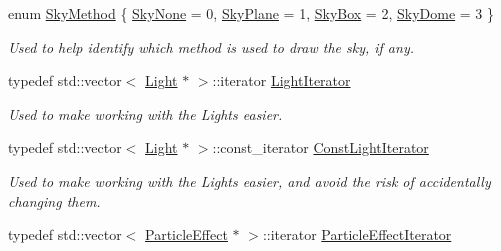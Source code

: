 \begin{DoxyCompactItemize}
enum \hyperlink{classphys_1_1SceneManager_a91dd086aabaab926d070c65fc14828d6}{SkyMethod} \{ \hyperlink{classphys_1_1SceneManager_a91dd086aabaab926d070c65fc14828d6a11aa0789aa0b39732c6968587b56e026}{SkyNone} =  0, 
\hyperlink{classphys_1_1SceneManager_a91dd086aabaab926d070c65fc14828d6af1251fd4f24ec8061fb585474635c10f}{SkyPlane} =  1, 
\hyperlink{classphys_1_1SceneManager_a91dd086aabaab926d070c65fc14828d6ac2ecb3ad06b3b545c27b7d70ca1b3a5a}{SkyBox} =  2, 
\hyperlink{classphys_1_1SceneManager_a91dd086aabaab926d070c65fc14828d6aa3c39672f84de2ae8ffb883e04af2edd}{SkyDome} =  3
 \}
\begin{DoxyCompactList}\small\item\em Used to help identify which method is used to draw the sky, if any. \item\end{DoxyCompactList}\item 
\hypertarget{classphys_1_1SceneManager_a2764b9082b4aecbf833c2f6e9f174ba0}{
typedef std::vector$<$ \hyperlink{classphys_1_1Light}{Light} $\ast$ $>$::iterator \hyperlink{classphys_1_1SceneManager_a2764b9082b4aecbf833c2f6e9f174ba0}{LightIterator}}
\label{dd/da8/classphys_1_1SceneManager_a2764b9082b4aecbf833c2f6e9f174ba0}

\begin{DoxyCompactList}\small\item\em Used to make working with the Lights easier. \item\end{DoxyCompactList}\item 
\hypertarget{classphys_1_1SceneManager_a417c57b560317661d0c7d836a88f52ac}{
typedef std::vector$<$ \hyperlink{classphys_1_1Light}{Light} $\ast$ $>$::const\_\-iterator \hyperlink{classphys_1_1SceneManager_a417c57b560317661d0c7d836a88f52ac}{ConstLightIterator}}
\label{dd/da8/classphys_1_1SceneManager_a417c57b560317661d0c7d836a88f52ac}

\begin{DoxyCompactList}\small\item\em Used to make working with the Lights easier, and avoid the risk of accidentally changing them. \item\end{DoxyCompactList}\item 
\hypertarget{classphys_1_1SceneManager_a668ef8db2053cc15cc48b21fa6240c3e}{
typedef std::vector$<$ \hyperlink{classphys_1_1ParticleEffect}{ParticleEffect} $\ast$ $>$::iterator \hyperlink{classphys_1_1SceneManager_a668ef8db2053cc15cc48b21fa6240c3e}{ParticleEffectIterator}}
\label{dd/da8/classphys_1_1SceneManager_a668ef8db2053cc15cc48b21fa6240c3e}


\end{DoxyCompactItemize}
